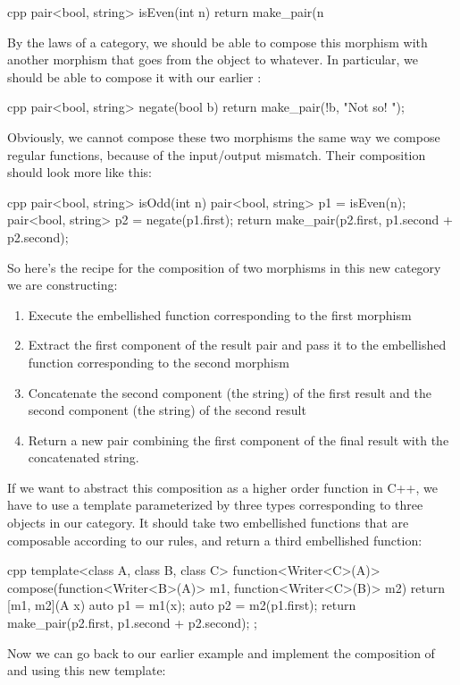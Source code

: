 \begin{snip}{cpp}
pair<bool, string> isEven(int n) {
    return make_pair(n %
}
\end{snip}
By the laws of a category, we should be able to compose this morphism
with another morphism that goes from the object  to
whatever. In particular, we should be able to compose it with our
earlier :

\begin{snip}{cpp}
pair<bool, string> negate(bool b) {
    return make_pair(!b, "Not so! ");
}
\end{snip}
Obviously, we cannot compose these two morphisms the same way we compose
regular functions, because of the input/output mismatch. Their
composition should look more like this:

\begin{snip}{cpp}
pair<bool, string> isOdd(int n) {
    pair<bool, string> p1 = isEven(n);
    pair<bool, string> p2 = negate(p1.first);
    return make_pair(p2.first, p1.second + p2.second);
}
\end{snip}
So here's the recipe for the composition of two morphisms in this new
category we are constructing:

\begin{enumerate}
\tightlist
\item
  Execute the embellished function corresponding to the first morphism
\item
  Extract the first component of the result pair and pass it to the
  embellished function corresponding to the second morphism
\item
  Concatenate the second component (the string) of the first result
  and the second component (the string) of the second result
\item
  Return a new pair combining the first component of the final result
  with the concatenated string.
\end{enumerate}

If we want to abstract this composition as a higher order function in
C++, we have to use a template parameterized by three types
corresponding to three objects in our category. It should take two
embellished functions that are composable according to our rules, and
return a third embellished function:

\begin{snip}{cpp}
template<class A, class B, class C>
function<Writer<C>(A)> compose(function<Writer<B>(A)> m1,
                               function<Writer<C>(B)> m2)
{
    return [m1, m2](A x) {
        auto p1 = m1(x);
        auto p2 = m2(p1.first);
        return make_pair(p2.first, p1.second + p2.second); 
    };
}
\end{snip}
Now we can go back to our earlier example and implement the composition
of  and  using this new template:

